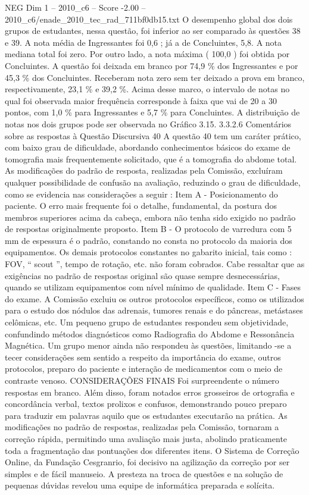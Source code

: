 \begin{textsample}{NEG Dim 1 – 2010\_c6 – Score -2.00 – 2010\_c6/enade\_2010\_tec\_rad\_711bf0db15.txt}
O desempenho global dos dois grupos de estudantes, nessa questão, foi inferior ao ser comparado às questões 38 e 39.
A nota média de Ingressantes foi 0,6 ; já a de Concluintes, 5,8.
A nota mediana total foi zero.
Por outro lado, a nota máxima ( 100,0 ) foi obtida por Concluintes.
A questão foi deixada em branco por 74,9 \% dos Ingressantes e por 45,3 \% dos Concluintes.
Receberam nota zero sem ter deixado a prova em branco, respectivamente, 23,1 \% e 39,2 \%.
Acima desse marco, o intervalo de notas no qual foi observada maior frequência corresponde à faixa que vai de 20 a 30 pontos, com 1,0 \% para Ingressantes e 5,7 \% para Concluintes.
A distribuição de notas nos dois grupos pode ser observada no Gráfico 3.15. 3.3.2.6 Comentários sobre as respostas à Questão Discursiva 40 A questão 40 tem um caráter prático, com baixo grau de dificuldade, abordando conhecimentos básicos do exame de tomografia mais frequentemente solicitado, que é a tomografia do abdome total.
As modificações do padrão de resposta, realizadas pela Comissão, excluíram qualquer possibilidade de confusão na avaliação, reduzindo o grau de dificuldade, como se evidencia nas considerações a seguir : Item A - Posicionamento do paciente.
O erro mais frequente foi o detalhe, fundamental, da postura dos membros superiores acima da cabeça, embora não tenha sido exigido no padrão de respostas originalmente proposto.
Item B - O protocolo de varredura com 5 mm de espessura é o padrão, constando no consta no protocolo da maioria dos equipamentos.
Os demais protocolos constantes no gabarito inicial, tais como : FOV, “ scout ”, tempo de rotação, etc. não foram cobrados.
Cabe ressaltar que as exigências no padrão de respostas original são quase sempre desnecessárias, quando se utilizam equipamentos com nível mínimo de qualidade.
Item C - Fases do exame.
A Comissão excluiu os outros protocolos específicos, como os utilizados para o estudo dos nódulos das adrenais, tumores renais e do pâncreas, metástases celômicas, etc.
Um pequeno grupo de estudantes respondeu sem objetividade, confundindo métodos diagnósticos como Radiografia do Abdome e Ressonância Magnética.
Um grupo menor ainda não respondeu às questões, limitando -se a tecer considerações sem sentido a respeito da importância do exame, outros protocolos, preparo do paciente e interação de medicamentos com o meio de contraste venoso.
CONSIDERAÇÕES FINAIS Foi surpreendente o número respostas em branco.
Além disso, foram notados erros grosseiros de ortografia e concordância verbal, textos prolixos e confusos, demonstrando pouco preparo para traduzir em palavras aquilo que os estudantes executarão na prática.
As modificações no padrão de respostas, realizadas pela Comissão, tornaram a correção rápida, permitindo uma avaliação mais justa, abolindo praticamente toda a fragmentação das pontuações dos diferentes itens.
O Sistema de Correção Online, da Fundação Cesgranrio, foi decisivo na agilização da correção por ser simples e de fácil manuseio.
A presteza na troca de questões e na solução de pequenas dúvidas revelou uma equipe de informática preparada e solícita.

\end{textsample}
